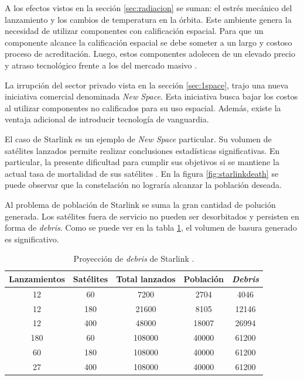 A los efectos vistos en la sección \ref{sec:radiacion} se suman: el estrés mecánico del lanzamiento y los cambios de temperatura en la órbita.
Este ambiente genera la necesidad de utilizar componentes con calificación espacial.
Para que un componente alcance la calificación espacial se debe someter a un largo y costoso proceso de acreditación.
Luego, estos componentes adolecen de un elevado precio y atraso tecnológico frente a los del mercado masivo \citep{ARTICLE:negocio}.

La irrupción del sector privado vista en la sección \ref{sec:1space}, trajo una nueva iniciativa comercial denominada \emph{New Space}.
Esta iniciativa busca bajar los costos al utilizar componentes no calificados para su uso espacial.
Además, existe la ventaja adicional de introducir tecnología de vanguardia.

El caso de Starlink es un ejemplo de \emph{New Space} particular.
Su volumen de satélites lanzados permite realizar conclusiones estadísticas significativas.
En particular, la presente dificultad para cumplir sus objetivos si se mantiene la actual tasa de mortalidad de sus satélites \citep{ARTICLE:cibils}.
En la figura \ref{fig:starlinkdeath} se puede observar que la constelación no lograría alcanzar la población deseada.
 
Al problema de población de Starlink se suma la gran cantidad de polución generada.
Los satélites fuera de servicio no pueden ser desorbitados y persisten en forma de \emph{debris}.
Como se puede ver en la tabla \ref{tab:starlinkdebris}, el volumen de basura generado es significativo.

\begin{table}[h]
	\centering
    \caption[Proyección de \emph{debris}]{Proyección de \emph{debris} de Starlink \citep{ARTICLE:cibils}.}
	\begin{tabular}{c c c c c}    
		\toprule
        \textbf{Lanzamientos} & \textbf{Satélites} & \textbf{Total lanzados} & \textbf{Población} & \textbf{\emph{Debris}}\\
		\midrule
        12                    & 60                 & 7200                    & 2704               & 4046\\		
        12                    & 180                & 21600                   & 8105               & 12146\\		
        12                    & 400                & 48000                   & 18007              & 26994\\		
        180                   & 60                 & 108000                  & 40000              & 61200\\		
        60                    & 180                & 108000                  & 40000              & 61200\\		
        27                    & 400                & 108000                  & 40000              & 61200\\		
		\bottomrule
		\hline
	\end{tabular}
	\label{tab:starlinkdebris}
\end{table}

